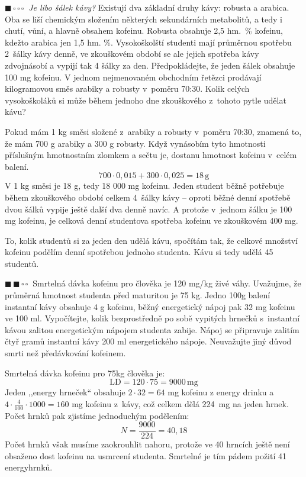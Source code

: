 \documentclass{book}
\newcommand{\jeden}{$\blacksquare \, \square \, \square \, \square \; \; $}
\newcommand{\dva}{$\blacksquare \, \blacksquare \, \square \, \square \; \; $}
\renewenvironment{quotation}{\par}{\par} %
\begin{document}
\hrulefill %
\begin{quotation}
\jeden \textit{Je libo šálek kávy?} Existují dva základní druhy kávy: robusta a arabica. Oba se liší
chemickým složením některých sekundárních metabolitů, a tedy i chutí,
vůní, a hlavně obsahem kofeinu. Robusta obsahuje 2,5 hm.~\% kofeinu,
kdežto arabica jen 1,5 hm. \%. Vysokoškolští studenti mají průměrnou
spotřebu 2~šálky kávy denně, ve zkouškovém období se ale jejich spotřeba kávy zdvojnásobí a vypijí tak 4 šálky za den. Předpokládejte, že jeden šálek obsahuje 100 mg kofeinu.
V jednom nejmenovaném obchodním řetězci prodávají kilogramovou směs
arabiky a robusty v~poměru 70:30. Kolik celých vysokoškoláků si může
během jednoho dne zkouškového z~tohoto pytle udělat kávu?
\end{quotation} \dotfill \par 
Pokud mám 1 kg směsi složené z~arabiky a robusty v~poměru 70:30, 
znamená to, že mám 700 g arabiky a 300 g robusty. Když vynásobím tyto hmotnosti příslušným hmotnostním zlomkem a sečtu je, dostanu hmotnost  kofeinu v~celém balení. 
\[
700\cdot0,015+300\cdot0,025=18\,\mathrm{g}
\]
V 1 kg směsi je 18 g, tedy 18 000 mg kofeinu. Jeden student běžně
potřebuje během zkouškového období celkem 4~šálky kávy -- oproti běžné denní spotřebě dvou šálků vypije ještě další dva denně navíc. A protože v~jednom šálku
je 100 mg kofeinu, je celková denní studentova spotřeba kofeinu ve zkouškovém 400 mg. 

To, kolik studentů si za jeden den udělá kávu, spočítám tak, že celkové
množství kofeinu podělím denní spotřebou jednoho studenta. Kávu si
tedy udělá 45 studentů.

\newpage %

\begin{quotation}
\dva Smrtelná dávka kofeinu pro člověka je 120 mg/kg živé váhy. Uvažujme,
že průměrná hmotnost studenta před maturitou je 75 kg. Jedno 100g
balení instantní kávy obsahuje 4 g kofeinu, běžný energetický nápoj
pak 32 mg kofeinu ve 100 ml. Vypočítejte, kolik bezprostředně po sobě
vypitých hrnečků s~instantní kávou zalitou energetickým nápojem studenta
zabije. Nápoj se připravuje zalitím čtyř gramů instantní kávy 200
ml energetického nápoje. Neuvažujte jiný důvod smrti než předávkování
kofeinem.
\end{quotation} \dotfill \par 
Smrtelná dávka kofeinu pro 75kg člověka je:
\[
\mathrm{LD}=120\cdot75=9000\,\mathrm{mg}
\]
Jeden ,,energy hrneček`` obsahuje $2\cdot32 = 64$ mg kofeinu
z energy drinku a $4\cdot\frac{4}{100}\cdot 1000 = 160$ mg kofeinu z~kávy, což celkem
dělá 224~mg na jeden hrnek. Počet hrnků pak zjistíme jednoduchým podělením:
\[
N=\frac{9000}{224}=40,18
\]
Počet hrnků však musíme zaokrouhlit nahoru,
protože ve 40 hrncích ještě není obsaženo dost kofeinu na usmrcení studenta. Smrtelné je tím pádem požití 41 energyhrnků.
\end{document}
